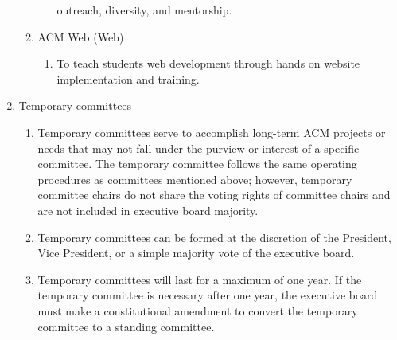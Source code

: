 \begin{enumerate}[label=\Alph*.]
\begin{enumerate}
\begin{enumerate}
            outreach, diversity, and mentorship.
        \end{enumerate}
      \item ACM Web (Web)
        \begin{enumerate}
          \item To teach students web development through hands on website
            implementation and training.
        \end{enumerate}
      \end{enumerate}
  \item Temporary committees
    \begin{enumerate}
      \item Temporary committees serve to accomplish long-term ACM projects or
        needs that may not fall under the purview or interest of a specific
        committee. The temporary committee follows the same operating procedures
        as committees mentioned above; however, temporary committee chairs do
        not share the voting rights of committee chairs and are not included in
        executive board majority.
      \item Temporary committees can be formed at the discretion of the
        President, Vice President, or a simple majority vote of the executive
        board.
      \item Temporary committees will last for a maximum of one year. If the
        temporary committee is necessary after one year, the executive board
        must make a constitutional amendment to convert the temporary committee
        to a standing committee.
    \end{enumerate}
\end{enumerate}
